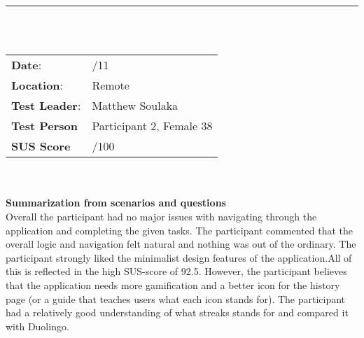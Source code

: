 \noindent\rule{15.1cm}{0.4pt}\\
\\
\begin{tabularx}{0.6\textwidth}{ >{\raggedright\arraybackslash}X  >{\raggedright\arraybackslash}X  }
\textbf{Date}: & 21/11  \\
\textbf{Location}: & Remote  \\
\textbf{Test Leader}: & Matthew Soulaka  \\
\textbf{Test Person} & Participant 2, Female 38  \\
\textbf{SUS Score} & 92.5/100  \\

\end{tabularx}\\
\\
\textbf{Summarization from scenarios and questions} \\
\noindent Overall the participant had no major issues with navigating through the application and completing the given tasks. The participant commented that the overall logic and navigation felt natural and nothing was out of the ordinary. The participant strongly liked the minimalist design features of the application.All of this is reflected in the high SUS-score of 92.5. However, the participant believes that the application needs more gamification and a better icon for the history page (or a guide that teaches users what each icon stands for). The participant had a relatively good understanding of what streaks stands for and compared it with Duolingo.\\

